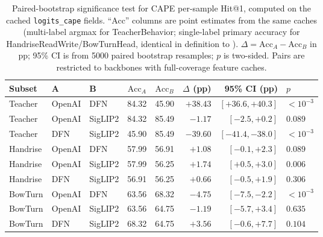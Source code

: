 \documentclass[symmetry,article,submit,pdftex,moreauthors]{Definitions/mdpi}
\begin{document}
\begin{table}[H]
\caption{Paired-bootstrap significance test for CAPE per-sample Hit@1, computed on the cached \texttt{logits\_cape} fields. ``Acc'' columns are point estimates from the same caches (multi-label argmax for TeacherBehavior; single-label primary accuracy for HandriseReadWrite/BowTurnHead, identical in definition to ). $\Delta=\text{Acc}_A-\text{Acc}_B$ in pp; 95\% CI is from 5000 paired bootstrap resamples; $p$ is two-sided. Pairs are restricted to backbones with full-coverage feature caches.}
\label{tab:paired_bootstrap}
\centering
\small
\setlength{\tabcolsep}{4pt}
\begin{tabular}{l ll cc r r l}
\toprule
\textbf{Subset} & \textbf{A} & \textbf{B} & $\text{Acc}_A$ & $\text{Acc}_B$ & $\Delta$ (pp) & 95\% CI (pp) & $p$ \\
\midrule
Teacher  & OpenAI  & DFN     & 84.32 & 45.90 & $+38.43$ & $[+36.6,+40.3]$ & $<10^{-3}$ \\
Teacher  & OpenAI  & SigLIP2 & 84.32 & 85.49 & $-1.17$  & $[-2.5,+0.2]$    & $0.089$    \\
Teacher  & DFN     & SigLIP2 & 45.90 & 85.49 & $-39.60$ & $[-41.4,-38.0]$ & $<10^{-3}$ \\
\midrule
Handrise & OpenAI  & DFN     & 57.99 & 56.91 & $+1.08$  & $[-0.1,+2.3]$    & $0.089$    \\
Handrise & OpenAI  & SigLIP2 & 57.99 & 56.25 & $+1.74$  & $[+0.5,+3.0]$    & $0.006$    \\
Handrise & DFN     & SigLIP2 & 56.91 & 56.25 & $+0.66$  & $[-0.5,+1.9]$    & $0.306$    \\
\midrule
BowTurn  & OpenAI  & DFN     & 63.56 & 68.32 & $-4.75$  & $[-7.5,-2.2]$    & $<10^{-3}$ \\
BowTurn  & OpenAI  & SigLIP2 & 63.56 & 64.75 & $-1.19$  & $[-5.7,+3.4]$    & $0.635$    \\
BowTurn  & DFN     & SigLIP2 & 68.32 & 64.75 & $+3.56$  & $[-0.6,+7.7]$    & $0.104$    \\
\bottomrule
\end{tabular}
\end{table}
\end{document}
